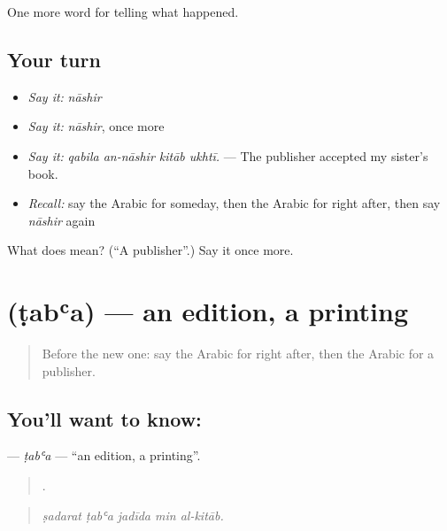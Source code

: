 \begin{grammarlens}[title={What you've built}]
One more word for telling what happened.
\end{grammarlens}

\subsection*{Your turn}
\begin{itemize}
\raggedright
  \item \emph{Say it:} \emph{nāshir}
  \item \emph{Say it:} \emph{nāshir}, once more
  \item \emph{Say it:} \emph{qabila an-nāshir kitāb ukhtī.} — The publisher accepted my sister’s book.
  \item \emph{Recall:} say the Arabic for someday, then the Arabic for right after, then say \emph{nāshir} again
\end{itemize}

\begin{tcolorbox}[breakable,colback=teal!4,colframe=teal!35!black,title={Before you move on}]
What does  mean? (\textquotedblleft{}A publisher\textquotedblright{}.) Say it once more.
\end{tcolorbox}
\section[\texorpdfstring{\ar{طبعة} (ṭabʿa)}{طبعة (ṭabʿa)}]{ (ṭabʿa) — an edition, a printing}

\label{lesson:AR-C350-taba}



\begin{quote}
Before the new one: say the Arabic for right after, then the Arabic for a publisher.
\end{quote}

\subsection*{You'll want to know: }
\textbf{} — \emph{ṭabʿa} — \textquotedblleft{}an edition, a printing\textquotedblright{}.

\begin{quote}
    .
\end{quote}

\begin{quote}
\emph{ṣadarat ṭabʿa jadīda min al-kitāb.}
\end{quote}

